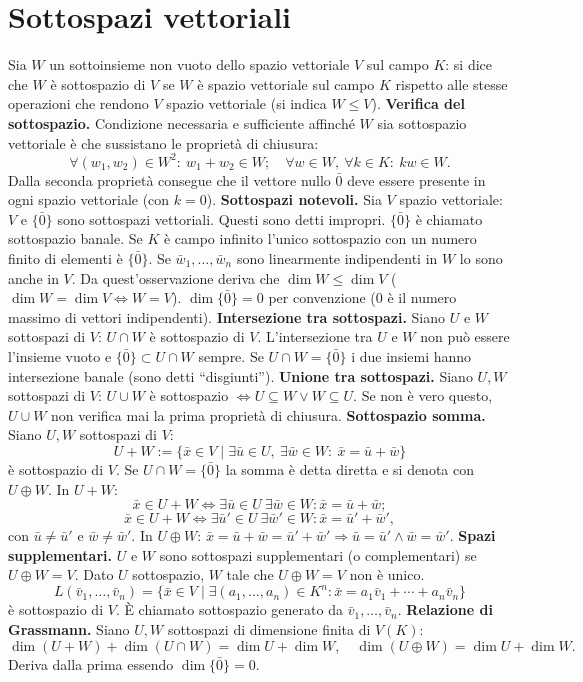 \documentclass[11pt,a4paper]{article}
\newcommand{\pagina}[1]{\clearpage}
\begin{document}
\section*{Sottospazi vettoriali}
Sia $W$ un sottoinsieme non vuoto dello spazio vettoriale $V$ sul campo $K$: si dice che $W$ è sottospazio di $V$ se $W$ è spazio vettoriale sul campo $K$ rispetto alle stesse operazioni che rendono $V$ spazio vettoriale (si indica $W\le V$).
\pagina{36}
\textbf{Verifica del sottospazio.} Condizione necessaria e sufficiente affinché $W$ sia sottospazio vettoriale è che sussistano le proprietà di chiusura:
\[\forall(w_1,w_2)\in W^2:\ w_1+w_2\in W;\quad\forall w\in W,\ \forall k\in K:\ kw\in W.\]
Dalla seconda proprietà consegue che il vettore nullo $\bar0$ deve essere presente in ogni spazio vettoriale (con $k=0$).
\textbf{Sottospazi notevoli.} Sia $V$ spazio vettoriale: $V$ e $\{\bar0\}$ sono sottospazi vettoriali. Questi sono detti impropri. $\{\bar0\}$ è chiamato sottospazio banale. Se $K$ è campo infinito l'unico sottospazio con un numero finito di elementi è $\{\bar0\}$.
Se $\bar w_1,\ldots,\bar w_n$ sono linearmente indipendenti in $W$ lo sono anche in $V$. Da quest'osservazione deriva che $\dim W\le\dim V$ ($\dim W=\dim V\Longleftrightarrow W=V$).
$\dim\{\bar0\}=0$ per convenzione ($0$ è il numero massimo di vettori indipendenti).
\pagina{37}
\textbf{Intersezione tra sottospazi.} Siano $U$ e $W$ sottospazi di $V$: $U\cap W$ è sottospazio di $V$. L'intersezione tra $U$ e $W$ non può essere l'insieme vuoto e $\{\bar0\}\subset U\cap W$ sempre. Se $U\cap W=\{\bar0\}$ i due insiemi hanno intersezione banale (sono detti ``disgiunti'').
\textbf{Unione tra sottospazi.} Siano $U,W$ sottospazi di $V$: $U\cup W$ è sottospazio $\Longleftrightarrow U\subseteq W\vee W\subseteq U$. Se non è vero questo, $U\cup W$ non verifica mai la prima proprietà di chiusura.
\textbf{Sottospazio somma.} Siano $U,W$ sottospazi di $V$:
\[U+W:=\{\bar x\in V\mid\exists\bar u\in U,\ \exists\bar w\in W:\ \bar x=\bar u+\bar w\}\]
è sottospazio di $V$. Se $U\cap W=\{\bar0\}$ la somma è detta diretta e si denota con $U\oplus W$.
In $U+W$:
\[\bar x\in U+W\Longleftrightarrow\exists\bar u\in U\ \exists\bar w\in W:\bar x=\bar u+\bar w;\]
\[\bar x\in U+W\Longleftrightarrow\exists\bar u'\in U\ \exists\bar w'\in W:\bar x=\bar u'+\bar w',\]
con $\bar u\ne\bar u'$ e $\bar w\ne\bar w'$.
\pagina{38}
In $U\oplus W$: $\bar x=\bar u+\bar w=\bar u'+\bar w'\Rightarrow\bar u=\bar u'\wedge\bar w=\bar w'$.
\textbf{Spazi supplementari.} $U$ e $W$ sono sottospazi supplementari (o complementari) se $U\oplus W=V$. Dato $U$ sottospazio, $W$ tale che $U\oplus W=V$ non è unico.
\[L(\bar v_1,\ldots,\bar v_n)=\{\bar x\in V\mid\exists(a_1,\ldots,a_n)\in K^n:\bar x=a_1\bar v_1+\cdots+a_n\bar v_n\}\]
è sottospazio di $V$. È chiamato sottospazio generato da $\bar v_1,\ldots,\bar v_n$.
\textbf{Relazione di Grassmann.} Siano $U,W$ sottospazi di dimensione finita di $V(K)$:
\[\dim(U+W)+\dim(U\cap W)=\dim U+\dim W,\quad\dim(U\oplus W)=\dim U+\dim W.\]
Deriva dalla prima essendo $\dim\{\bar0\}=0$.
\end{document}
